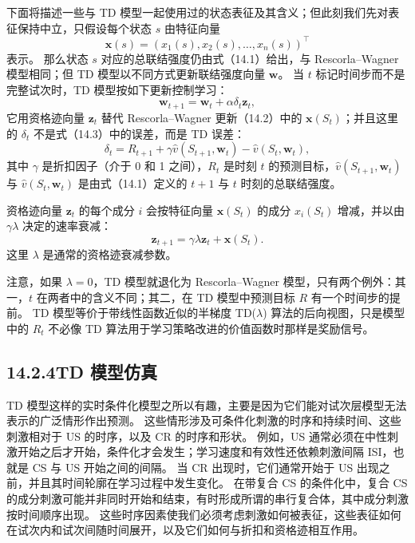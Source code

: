 \documentclass[UTF8,12pt,a4paper,fontset=fandol]{ctexart}
\begin{document}
下面将描述一些与 TD 模型一起使用过的状态表征及其含义；但此刻我们先对表征保持中立，只假设每个状态 $s$ 由特征向量
\[
\mathbf{x}(s)=(x_1(s),x_2(s),\ldots,x_n(s))^\top
\]
表示。
那么状态 $s$ 对应的总联结强度仍由式（14.1）给出，与 Rescorla--Wagner 模型相同；但 TD 模型以不同方式更新联结强度向量 $\mathbf{w}$。
当 $t$ 标记时间步而不是完整试次时，TD 模型按如下更新控制学习：
\begin{equation}
\mathbf{w}_{t+1}=\mathbf{w}_t+\alpha\delta_t\mathbf{z}_t,
\tag{14.4}
\end{equation}
它用资格迹向量 $\mathbf{z}_t$ 替代 Rescorla--Wagner 更新（14.2）中的 $\mathbf{x}(S_t)$；并且这里的 $\delta_t$ 不是式（14.3）中的误差，而是 TD 误差：
\begin{equation}
\delta_t=R_{t+1}+\gamma\hat v(S_{t+1},\mathbf{w}_t)-\hat v(S_t,\mathbf{w}_t),
\tag{14.5}
\end{equation}
其中 $\gamma$ 是折扣因子（介于 0 和 1 之间），$R_t$ 是时刻 $t$ 的预测目标，$\hat v(S_{t+1},\mathbf{w}_t)$ 与 $\hat v(S_t,\mathbf{w}_t)$ 是由式（14.1）定义的 $t+1$ 与 $t$ 时刻的总联结强度。

资格迹向量 $\mathbf{z}_t$ 的每个成分 $i$ 会按特征向量 $\mathbf{x}(S_t)$ 的成分 $x_i(S_t)$ 增减，并以由 $\gamma\lambda$ 决定的速率衰减：
\begin{equation}
\mathbf{z}_{t+1}=\gamma\lambda\mathbf{z}_t+\mathbf{x}(S_t).
\tag{14.6}
\end{equation}
这里 $\lambda$ 是通常的资格迹衰减参数。

注意，如果 $\lambda=0$，TD 模型就退化为 Rescorla--Wagner 模型，只有两个例外：其一，$t$ 在两者中的含义不同；其二，在 TD 模型中预测目标 $R$ 有一个时间步的提前。
TD 模型等价于带线性函数近似的半梯度 TD($\lambda$) 算法的后向视图，只是模型中的 $R_t$ 不必像 TD 算法用于学习策略改进的价值函数时那样是奖励信号。

\subsection*{14.2.4\quad TD 模型仿真}

TD 模型这样的实时条件化模型之所以有趣，主要是因为它们能对试次层模型无法表示的广泛情形作出预测。
这些情形涉及可条件化刺激的时序和持续时间、这些刺激相对于 US 的时序，以及 CR 的时序和形状。
例如，US 通常必须在中性刺激开始之后才开始，条件化才会发生；学习速度和有效性还依赖刺激间隔 ISI，也就是 CS 与 US 开始之间的间隔。
当 CR 出现时，它们通常开始于 US 出现之前，并且其时间轮廓在学习过程中发生变化。
在带复合 CS 的条件化中，复合 CS 的成分刺激可能并非同时开始和结束，有时形成所谓的串行复合体，其中成分刺激按时间顺序出现。
这些时序因素使我们必须考虑刺激如何被表征，这些表征如何在试次内和试次间随时间展开，以及它们如何与折扣和资格迹相互作用。
\end{document}
